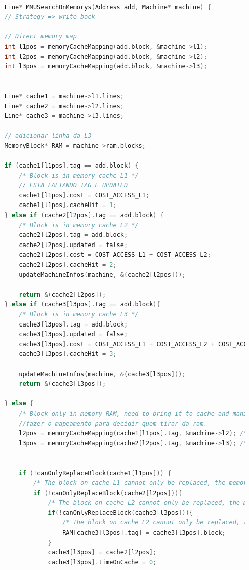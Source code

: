 \documentclass{article}
\begin{document}
\begin{lstlisting}[caption={Função MMUSearchOnMemorys},label={lst:cod6},language=C]

    Line* MMUSearchOnMemorys(Address add, Machine* machine) {
    // Strategy => write back
    
    // Direct memory map
    int l1pos = memoryCacheMapping(add.block, &machine->l1);
    int l2pos = memoryCacheMapping(add.block, &machine->l2);
    int l3pos = memoryCacheMapping(add.block, &machine->l3);


    Line* cache1 = machine->l1.lines;
    Line* cache2 = machine->l2.lines;
    Line* cache3 = machine->l3.lines;

    // adicionar linha da L3
    MemoryBlock* RAM = machine->ram.blocks;

    if (cache1[l1pos].tag == add.block) { 
        /* Block is in memory cache L1 */
        // ESTA FALTANDO TAG E UPDATED
        cache1[l1pos].cost = COST_ACCESS_L1;
        cache1[l1pos].cacheHit = 1;
    } else if (cache2[l2pos].tag == add.block) { 
        /* Block is in memory cache L2 */
        cache2[l2pos].tag = add.block;
        cache2[l2pos].updated = false;
        cache2[l2pos].cost = COST_ACCESS_L1 + COST_ACCESS_L2;
        cache2[l2pos].cacheHit = 2;
        updateMachineInfos(machine, &(cache2[l2pos]));

        return &(cache2[l2pos]);
    } else if (cache3[l3pos].tag == add.block){
        /* Block is in memory cache L3 */
        cache3[l3pos].tag = add.block;
        cache3[l3pos].updated = false;
        cache3[l3pos].cost = COST_ACCESS_L1 + COST_ACCESS_L2 + COST_ACCESS_L3;
        cache3[l3pos].cacheHit = 3;

        updateMachineInfos(machine, &(cache3[l3pos]));
        return &(cache3[l3pos]);

    } else { 
        /* Block only in memory RAM, need to bring it to cache and manipulate the blocks */
        //fazer o mapeamento para decidir quem tirar da ram.
        l2pos = memoryCacheMapping(cache1[l1pos].tag, &machine->l2); /* Need to check the position of the block that will leave the L1 */
        l3pos = memoryCacheMapping(cache2[l2pos].tag, &machine->l3); /* Need to check the position of the block that will leave the L1 */

        
        if (!canOnlyReplaceBlock(cache1[l1pos])) { 
            /* The block on cache L1 cannot only be replaced, the memories must be updated */
            if (!canOnlyReplaceBlock(cache2[l2pos])){
                /* The block on cache L2 cannot only be replaced, the memories must be updated */
                if(!canOnlyReplaceBlock(cache3[l3pos])){
                    /* The block on cache L2 cannot only be replaced, the memories must be updated */
                    RAM[cache3[l3pos].tag] = cache3[l3pos].block;
                }
                cache3[l3pos] = cache2[l2pos];
                cache3[l3pos].timeOnCache = 0;



\end{lstlisting}
\end{document}
